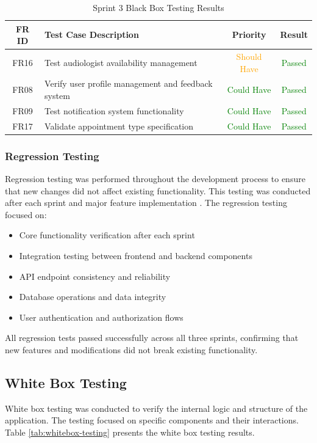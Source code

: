 \documentclass{article}
\begin{document}
\begin{table}[H]
\centering
\label{tab:sprint3-testing}
\begin{tabular}{|c|p{6cm}|c|c|}
\hline
\textbf{FR ID} & \textbf{Test Case Description} & \textbf{Priority} & \textbf{Result} \\ \hline
FR16 & Test audiologist availability management & \textcolor{orange}{Should Have} & \textcolor{green}{Passed} \\ \hline
FR08 & Verify user profile management and feedback system & \textcolor{green}{Could Have} & \textcolor{green}{Passed} \\ \hline
FR09 & Test notification system functionality & \textcolor{green}{Could Have} & \textcolor{green}{Passed} \\ \hline
FR17 & Validate appointment type specification & \textcolor{green}{Could Have} & \textcolor{green}{Passed} \\ \hline
\end{tabular}
\caption{Sprint 3 Black Box Testing Results}
\end{table}

\subsubsection{Regression Testing}
Regression testing was performed throughout the development process to ensure that new changes did not affect existing functionality. This testing was conducted after each sprint and major feature implementation \cite{grjoeay_regression_2024}. The regression testing focused on:

\begin{itemize}
    \item Core functionality verification after each sprint
    \item Integration testing between frontend and backend components
    \item API endpoint consistency and reliability
    \item Database operations and data integrity
    \item User authentication and authorization flows
\end{itemize}

All regression tests passed successfully across all three sprints, confirming that new features and modifications did not break existing functionality.

\subsection{White Box Testing}
White box testing was conducted to verify the internal logic and structure of the application. The testing focused on specific components and their interactions. Table \ref{tab:whitebox-testing} presents the white box testing results.
\end{document}
